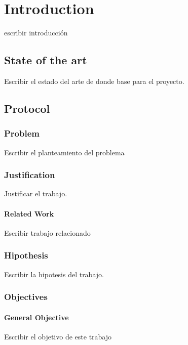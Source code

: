 
\chapter{Introduction}

escribir introducci\'on


\section{State of the art}

Escribir el estado del arte de donde base para el proyecto. 

\section{Protocol}

\subsection{Problem}

Escribir el planteamiento del problema


\subsection{Justification}

Justificar el trabajo. 

\subsubsection{Related Work} 

Escribir trabajo relacionado
	
\subsection{Hipothesis}

Escribir la hipotesis del trabajo.

\subsection{Objectives}
\subsubsection{General Objective}

Escribir el objetivo de este trabajo

